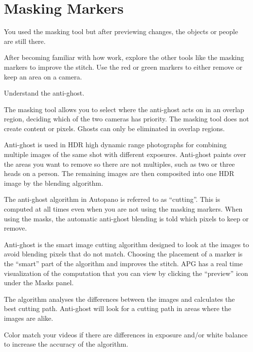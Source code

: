 \chapter{Masking Markers}
\pagecolor{white}
\label{chap:41}
\begin{fullwidth}


\problem

{\large You used the masking tool but after previewing changes, the objects or people are still there. \par}

After becoming familiar with how \textbf{} work, explore the other tools like the masking markers to improve the stitch. Use the red or green markers to either remove or keep an area on a camera. 


\solutions

{\large Understand the anti-ghost. \par}

The masking tool allows you to select where the anti-ghost acts on in an overlap region, deciding which of the two cameras has priority. The masking tool does not create content or pixels. Ghosts can only be eliminated in overlap regions.


Anti-ghost is used in HDR high dynamic range photographs for combining multiple images of the same shot with different exposures. Anti-ghost paints over the areas you want to remove so there are not multiples, such as two or three heads on a person. The remaining images are then composited into one HDR image by the blending algorithm.

The anti-ghost algorithm in Autopano is referred to as “cutting”. This is computed at all times even when you are not using the masking markers. When using the masks, the automatic anti-ghost blending is told which pixels to keep or remove. 

Anti-ghost is the smart image cutting algorithm designed to look at the images to avoid blending pixels that do not match. Choosing the placement of a marker is the “smart” part of the algorithm and improves the stitch. APG has a real time visualization of the computation that you can view by clicking the “preview” icon under the Masks panel.

The algorithm analyses the differences between the images and calculates the best cutting path. Anti-ghost will look for a cutting path in areas where the images are alike. 

\tip Color match your videos if there are differences in exposure and/or white balance to increase the accuracy of the algorithm.


\end{fullwidth}
